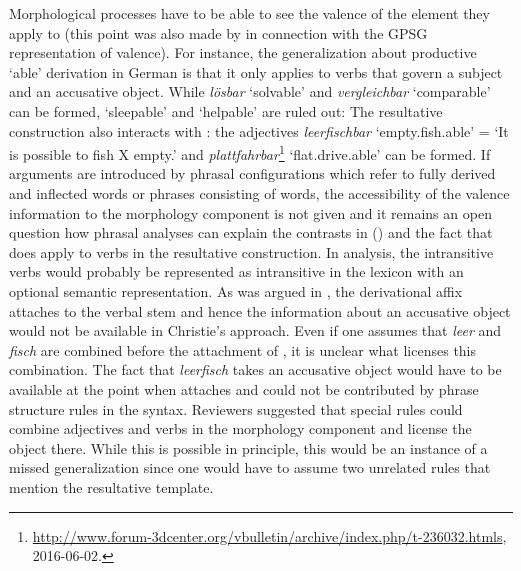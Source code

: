 Morphological processes have to be able to see the valence of the element they apply to (this point
was also made by  in connection with the GPSG representation of
valence). For instance, the generalization about productive  `able' derivation in German is that it only applies to
verbs that govern a subject and an accusative object. While \emph{lösbar} `solvable' and
\emph{ver\-gleich\-bar} `comparable' can be formed,  `sleepable' and  `helpable' are ruled out:
\eal
\settowidth{}
\zl
The resultative construction also interacts with \bard: the adjectives \emph{leerfischbar}
`empty.fish.able' = `It is possible to fish X empty.' and \emph{platt\-fahr\-bar}\footnote{%
  \url{http://www.forum-3dcenter.org/vbulletin/archive/index.php/t-236032.htmls}, 2016-06-02.
} `flat.drive.able' can be formed. If arguments are introduced by phrasal configurations which refer to
fully derived and inflected words or phrases consisting of words, the
accessibility of the valence information to the morphology component is not given and it remains an
open question how phrasal analyses can explain the contrasts in () and the fact that
\bard does apply to verbs in the resultative construction. In  analysis, the intransitive
verbs would probably be represented as intransitive in the lexicon with an optional semantic
representation. As was argued in , the derivational affix attaches to the verbal
stem and hence the information about an accusative object would not be available in Christie's
approach. Even if one assumes that \emph{leer} and \emph{fisch} are combined before the attachment
of , it is unclear what licenses this combination. The fact that \emph{leerfisch} takes
an accusative object would have to be available at the point when  attaches and could
not be contributed by phrase structure rules in the syntax. Reviewers suggested that special rules
could combine adjectives and verbs in the morphology component and license the object there. While
this is possible in principle, this would be an instance of a missed generalization since one would
have to assume two unrelated rules that mention the resultative template.

